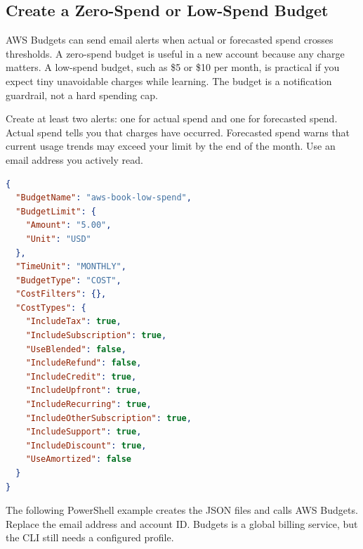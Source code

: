 \subsection{Create a Zero-Spend or Low-Spend Budget}
AWS Budgets can send email alerts when actual or forecasted spend crosses thresholds. A zero-spend budget is useful in a new account because any charge matters. A low-spend budget, such as \$5 or \$10 per month, is practical if you expect tiny unavoidable charges while learning. The budget is a notification guardrail, not a hard spending cap.

Create at least two alerts: one for actual spend and one for forecasted spend. Actual spend tells you that charges have occurred. Forecasted spend warns that current usage trends may exceed your limit by the end of the month. Use an email address you actively read.

\begin{lstlisting}[language=json,caption={Minimal monthly AWS budget definition for a low-spend learning guardrail.},label={lst:aws-budget-json}]
{
  "BudgetName": "aws-book-low-spend",
  "BudgetLimit": {
    "Amount": "5.00",
    "Unit": "USD"
  },
  "TimeUnit": "MONTHLY",
  "BudgetType": "COST",
  "CostFilters": {},
  "CostTypes": {
    "IncludeTax": true,
    "IncludeSubscription": true,
    "UseBlended": false,
    "IncludeRefund": false,
    "IncludeCredit": true,
    "IncludeUpfront": true,
    "IncludeRecurring": true,
    "IncludeOtherSubscription": true,
    "IncludeSupport": true,
    "IncludeDiscount": true,
    "UseAmortized": false
  }
}
\end{lstlisting}

The following PowerShell example creates the JSON files and calls AWS Budgets. Replace the email address and account ID. Budgets is a global billing service, but the CLI still needs a configured profile.

